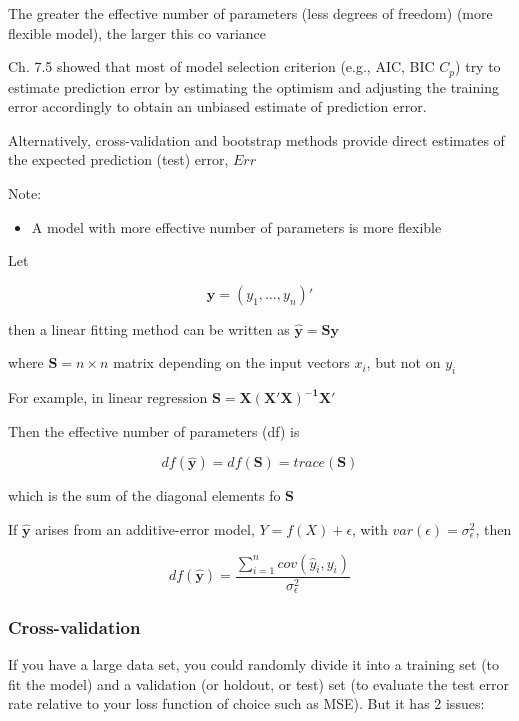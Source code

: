 \documentclass[
]{book}
\providecommand{\tightlist}{%
  \setlength{\itemsep}{0pt}\setlength{\parskip}{0pt}}
\begin{document}
The greater the effective number of parameters (less degrees of freedom) (more flexible model), the larger this co variance

\citep{hastie2001a} Ch. 7.5 showed that most of model selection criterion (e.g., AIC, BIC \(C_p\)) try to estimate prediction error by estimating the optimism and adjusting the training error accordingly to obtain an unbiased estimate of prediction error.

Alternatively, cross-validation and bootstrap methods provide direct estimates of the expected prediction (test) error, \(Err\)

Note:

\begin{itemize}
\tightlist
\item
  A model with more effective number of parameters is more flexible
\end{itemize}

Let

\[
\mathbf{y} = (y_1, \dots, y_n)'
\]

then a linear fitting method can be written as \(\mathbf{\hat{y}} = \mathbf{Sy}\)

where \(\mathbf{S} = n \times n\) matrix depending on the input vectors \(x_i\), but not on \(y_i\)

For example, in linear regression \(\mathbf{S = X(X'X)^{-1}X'}\)

Then the effective number of parameters (df) is

\[
df(\hat{\mathbf{y}}) = df (\mathbf{S}) = trace(\mathbf{S})
\]

which is the sum of the diagonal elements fo \(\mathbf{S}\)

If \(\hat{\mathbf{y}}\) arises from an additive-error model, \(Y = f(X) + \epsilon\), with \(var(\epsilon) = \sigma^2_\epsilon\), then

\[
df(\hat{\mathbf{y}}) = \frac{\sum_{i=1}^ncov(\hat{y}_i, y_i)}{\sigma^2_\epsilon}
\]

\hypertarget{cross-validation}{%
\subsubsection{Cross-validation}\label{cross-validation}}

If you have a large data set, you could randomly divide it into a training set (to fit the model) and a validation (or holdout, or test) set (to evaluate the test error rate relative to your loss function of choice such as MSE). But it has 2 issues:
\end{document}
